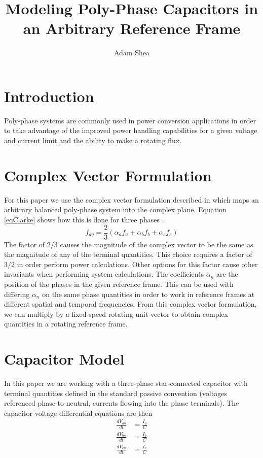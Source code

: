 \documentclass[10pt,letterpaper]{IEEEtran}
\begin{document}
\title{Modeling Poly-Phase Capacitors in an Arbitrary Reference Frame}
\author{Adam Shea}

\maketitle

\begin{abstract}
\end{abstract}

\section{Introduction}
Poly-phase systems are commonly used in power conversion applications in order
to take advantage of the improved power handling capabilities for a given
voltage and current limit and the ability to make a rotating flux.



\section{Complex Vector Formulation}
For this paper we use the complex vector formulation described in
\cite{NovotnyLipoBook} which maps an arbitrary balanced poly-phase system into the
complex plane.
Equation \ref{eqClarke} shows how this is done for three phases \cite{Clarke51}.
\begin{equation}
\label{eqClarke}
f_{dq} = \frac{2}{3} \left({\alpha_a f_a + \alpha_b f_b + \alpha_c f_c}\right)
\end{equation}
The factor of $2 / 3$ causes the magnitude of the complex vector to be the
same as the magnitude of any of the terminal quantities.
This choice requires a factor of $3 / 2$ in order perform power calculations.
Other options for this factor cause other invariants when performing system
calculations.
The coefficients $\alpha_n$ are the position of the phases in the given
reference frame.
This can be used with differing $\alpha_n$ on the same phase quantities in
order to work in reference frames at different spatial and temporal
frequencies. \cite{Rockhill09}
From this complex vector formulation, we can multiply by a fixed-speed
rotating unit vector to obtain complex quantities in a rotating reference
frame.

\section{Capacitor Model}
In this paper we are working with a three-phase star-connected capacitor with
terminal quantities defined in the standard passive convention (voltages
referenced phase-to-neutral, currents flowing into the phase terminals). 
The capacitor voltage differential equations are then
\begin{align}
\frac{d V_{an}}{dt} &= \frac{I_a}{C} \\
\frac{d V_{bn}}{dt} &= \frac{I_b}{C} \\
\frac{d V_{cn}}{dt} &= \frac{I_c}{C}
\end{align}
\end{document}
